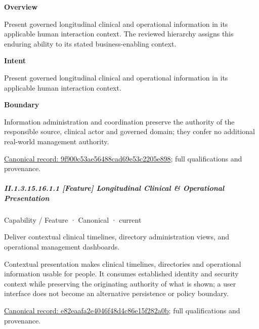 \textbf{Overview}



Present governed longitudinal clinical and operational information in its applicable human interaction context. The reviewed hierarchy assigns this enduring ability to its stated business-enabling context.



\textbf{Intent}



Present governed longitudinal clinical and operational information in its applicable human interaction context.



\textbf{Boundary}



Information administration and coordination preserve the authority of the responsible source, clinical actor and governed domain; they confer no additional real-world management authority.


{\footnotesize \href{../../../../continuum/strategy/capability/9f900c53ae56488cad69e53c2205e898.md}{Canonical record: 9f900c53ae56488cad69e53c2205e898}; full qualifications and provenance.}\par
\subparagraph*{II.1.3.15.16.1.1 [Feature] Longitudinal Clinical \& Operational Presentation}
\label{navigation:II.1.3.15.16.1.1}

\label{element:e82eaafa2e4046f48d4c86e15f282a0b}
{\small Capability / Feature · Canonical · current}\par

Deliver contextual clinical timelines, directory administration views, and operational management dashboards.



Contextual presentation makes clinical timelines, directories and operational information usable for people. It consumes established identity and security context while preserving the originating authority of what is shown; a user interface does not become an alternative persistence or policy boundary.


{\footnotesize \href{../../../../continuum/strategy/capability/feature/e82eaafa2e4046f48d4c86e15f282a0b.md}{Canonical record: e82eaafa2e4046f48d4c86e15f282a0b}; full qualifications and provenance.}\par
